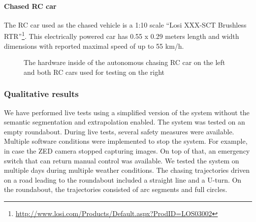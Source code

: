 \documentclass{ctuthesis/ctuthesis}
\begin{document}
\paragraph{Chased RC car}
The RC car used as the chased vehicle is a 1:10 scale ``Losi XXX-SCT Brushless RTR''\footnote{\href{http://www.losi.com/Products/Default.aspx?ProdID=LOS03002}{http://www.losi.com/Products/Default.aspx?ProdID=LOS03002}}. This electrically powered car has 0.55 x 0.29 meters length and width dimensions with reported maximal speed of up to 55 km/h.

\begin{figure}[h!]
    \centering
    \qquad
    \caption{The hardware inside of the autonomous chasing RC car on the left and both RC cars used for testing on the right}%
    \label{fig:rc_cars}%
\end{figure}



\subsubsection{Qualitative results}
We have performed live tests using a simplified version of the system without the semantic segmentation and extrapolation enabled. The system was tested on an empty roundabout. During live tests, several safety measures were available. Multiple software conditions were implemented to stop the system. For example, in case the ZED camera stopped capturing images. On top of that, an emergency switch that can return manual control was available. We tested the system on multiple days during multiple weather conditions. The chasing trajectories driven on a road leading to the roundabout included a straight line and a U-turn. On the roundabout, the trajectories consisted of arc segments and full circles. \par
\end{document}
